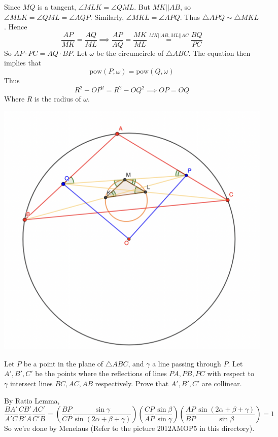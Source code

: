 \documentclass[11pt]{scrartcl}
\begin{document}
\begin{soln}
  Since $MQ$ is a tangent, $\angle MLK=\angle QML$. But $MK||AB$, so $\angle MLK=\angle QML=\angle AQP$. Similarly, $\angle MKL=\angle APQ$.
  Thus $\triangle APQ\sim\triangle MKL$. Hence
  $$\frac{AP}{MK}=\frac{AQ}{ML}\implies \frac{AP}{AQ}=\frac{MK}{ML}\stackrel{MK||AB, ML||AC}{=}\frac{BQ}{PC}$$
  So $AP\cdot PC=AQ\cdot BP$. Let $\omega$ be the circumcircle of $\triangle ABC$. The equation then implies that
  $$\mathrm{pow}(P,\omega)=\mathrm{pow}(Q,\omega)$$
  Thus
  $$R^2-OP^2=R^2-OQ^2\implies OP=OQ$$
  Where $R$ is the radius of $\omega$.
  \begin{center}\includegraphics[scale=0.3]{IMO2009P2.png}\end{center}
\end{soln}
\begin{example}
  [USAMO 2012]
  Let $P$ be a point in the plane of $\triangle ABC$, and $\gamma$ a line passing through $P$. Let $A', B', C'$ be the points where the reflections of lines $PA, PB, PC$ with respect to $\gamma$ intersect lines $BC, AC, AB$ respectively. Prove that $A', B', C'$ are collinear.
\end{example}
\begin{soln}
  By Ratio Lemma,
  $$\frac{BA'}{A'C}\frac{CB'}{B'A}\frac{AC'}{C'B}=\left(\frac{BP}{CP}\frac{\sin \gamma}{\sin(2\alpha+\beta+\gamma)}\right)\left(\frac{CP}{AP}\frac{\sin\beta}{\sin\gamma}\right)\left(\frac{AP}{BP}\frac{\sin(2\alpha+\beta+\gamma)}{\sin\beta}\right)=1$$
  So we're done by Menelaus (Refer to the picture 2012AMOP5 in this directory).
\end{soln}
\end{document}
